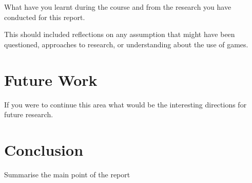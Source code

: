 \documentclass{article}
\begin{document}
What have you learnt during the course and from the research you have conducted for this report.

This should included reflections on any assumption that might have been questioned, approaches to research, or understanding about the use of games.


\section{Future Work}

If you were to continue this area what would be the interesting directions for future research. 

\section{Conclusion}
Summarise the main point of the report



\end{document}
